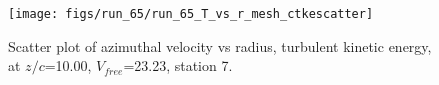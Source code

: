 \begin{figure}[H]
\centering
\texttt{[image: figs/run\_65/run\_65\_T\_vs\_r\_mesh\_ctkescatter]}
\caption{Scatter plot of azimuthal velocity vs radius, turbulent kinetic energy, at $z/c$=10.00, $V_{free}$=23.23, station 7.}
\label{fig:run_65_T_vs_r_mesh_ctkescatter}
\end{figure}


